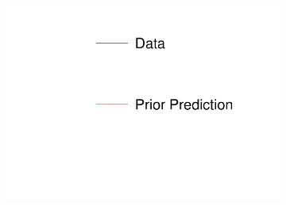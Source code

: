 \begin{figure}[!h]
\centering
\begin{subfigure}{.24\textwidth}
  \centering
  \includegraphics[width=\linewidth, clip]{figs/prior1dleg.pdf}
\end{subfigure}


\end{figure}

